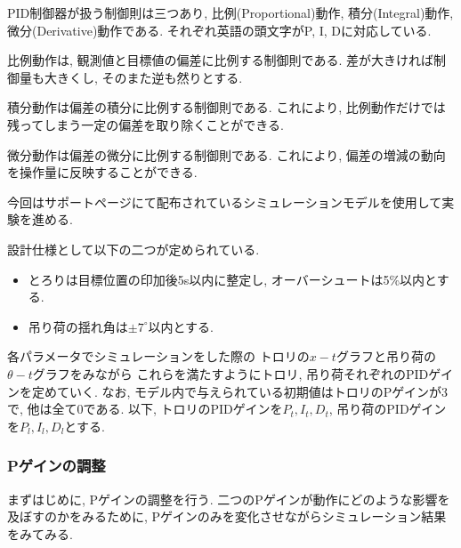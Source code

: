 \documentclass[titlepage]{jsarticle}
\begin{document}
        PID制御器が扱う制御則は三つあり, 比例(Proportional)動作, 積分(Integral)動作, 微分(Derivative)動作である.
        それぞれ英語の頭文字がP, I, Dに対応している.

        比例動作は, 観測値と目標値の偏差に比例する制御則である.
        差が大きければ制御量も大きくし, そのまた逆も然りとする.

        積分動作は偏差の積分に比例する制御則である.
        これにより, 比例動作だけでは残ってしまう一定の偏差を取り除くことができる.

        微分動作は偏差の微分に比例する制御則である.
        これにより, 偏差の増減の動向を操作量に反映することができる.

        今回はサポートページ\cite{supp}にて配布されているシミュレーションモデルを使用して実験を進める.

        設計仕様として以下の二つが定められている.

        \begin{itemize}
            \item とろりは目標位置の印加後5s以内に整定し,
                オーバーシュートは5\%以内とする.
            \item 吊り荷の揺れ角は$\pm7^\circ$以内とする.
        \end{itemize}

        各パラメータでシミュレーションをした際の
        トロリの$x-t$グラフと吊り荷の$\theta - t$グラフをみながら
        これらを満たすようにトロリ, 吊り荷それぞれのPIDゲインを定めていく.
        なお, モデル内で与えられている初期値はトロリのPゲインが3で,
        他は全て0である.
        以下, トロリのPIDゲインを$P_t, I_t, D_t$, 吊り荷のPIDゲインを$P_l, I_l, D_l$とする.

        \subsubsection{Pゲインの調整}
            まずはじめに, Pゲインの調整を行う.
            二つのPゲインが動作にどのような影響を及ぼすのかをみるために,
            Pゲインのみを変化させながらシミュレーション結果をみてみる.
            
\end{document}
